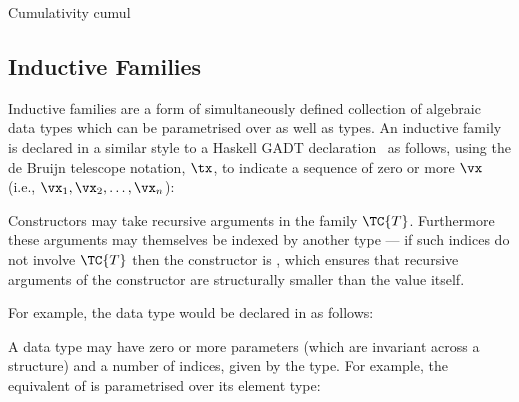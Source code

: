 {Cumulativity}
{cumul}

\subsection{Inductive Families}

\label{sect:inductivefams}

Inductive families \cite{dybjer1994inductive} are a form of simultaneously
defined collection of algebraic data types which can be parametrised over
 as well as types.  An inductive family is declared 
in a similar style to a Haskell GADT declaration~\cite{pj2006gadts}
as
follows, using the de Bruijn telescope notation, $\tx$, to indicate a
sequence of zero or more $\vx$ (i.e., $\vx_1,\vx_2,\ldots,\vx_n$):


Constructors may take recursive arguments in the family
$\TC{T}$. Furthermore these arguments may themselves be indexed by another type ---
if such indices do not involve $\TC{T}$ then the constructor is
, which ensures that recursive arguments of the
constructor are structurally smaller than the value itself.

For example, the \Idris{} data type  would be declared in \TT{} as follows:

\DM{
\Data\hg\Nat\Hab\Type\hg\Where\hg\Z\Hab\Nat\:\mid\:\suc\Hab\fbind{\vk}{\Nat}{\Nat}
}

A data type may have zero or more parameters (which are invariant
across a structure) and a number of indices, given by the type. For
example, the \TT{} equivalent of  is parametrised over its element type:

\DM{
\AR{
\Data\hg\List\:(\va\Hab\Type)\Hab\Type\hg\Where
\ARd{
& \nil\Hab\List\:\va\\
\mid & (\cons)\Hab\fbind{\vx}{\va}{\fbind{\vxs}{\List\:\va}{\List\:\va}}
}
}
}

